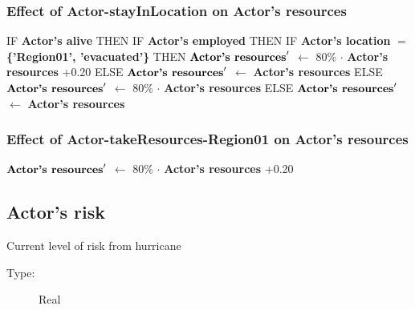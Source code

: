 \documentclass{article}%
\begin{document}
\subsubsection{Effect of Actor{-}stayInLocation on Actor's resources}%
\label{ssubsec:Effect of Actor{-}stayInLocation on Actor's resources}%
\begin{flushleft}%
IF %
\textbf{Actor's alive}%
\linebreak%
\hspace*{2em}%
THEN %
IF %
\textbf{Actor's employed}%
\linebreak%
\hspace*{4em}%
THEN %
IF %
\textbf{Actor's location}%
$=$%
\textbf{\{'Region01', 'evacuated'\}}%
\linebreak%
\hspace*{6em}%
THEN %
$\mbox{\textbf{Actor's resources}} '$%
$\leftarrow$%
80\%%
$\cdot$%
\textbf{Actor's resources}%
+0.20%
\linebreak%
\hspace*{6em}%
ELSE %
$\mbox{\textbf{Actor's resources}} '$%
$\leftarrow$%
\textbf{Actor's resources}%
\linebreak%
\hspace*{4em}%
ELSE %
$\mbox{\textbf{Actor's resources}} '$%
$\leftarrow$%
80\%%
$\cdot$%
\textbf{Actor's resources}%
\linebreak%
\hspace*{2em}%
ELSE %
$\mbox{\textbf{Actor's resources}} '$%
$\leftarrow$%
\textbf{Actor's resources}%
\end{flushleft}

%
\subsubsection{Effect of Actor{-}takeResources{-}Region01 on Actor's resources}%
\label{ssubsec:Effect of Actor{-}takeResources{-}Region01 on Actor's resources}%
\begin{flushleft}%
$\mbox{\textbf{Actor's resources}} '$%
$\leftarrow$%
80\%%
$\cdot$%
\textbf{Actor's resources}%
+0.20%
\end{flushleft}

%
\subsection{Actor's risk}%
\label{subsec:Actor's risk}%
Current level of risk from hurricane%
\begin{description}%
\item[Type:]%
Real%
\end{description}%
\end{document}
